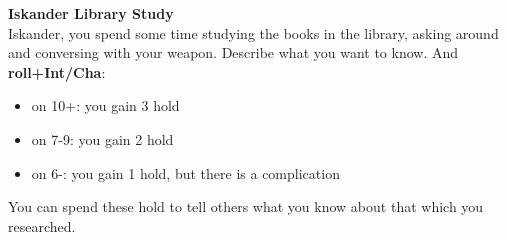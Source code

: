 {\noindent \bfseries Iskander Library Study}
\\

Iskander, you spend some time studying the books in the library, asking around and conversing with your weapon. Describe what you want to know. And \textbf{roll+Int/Cha}:
\begin{itemize}
	\item on 10+: you gain 3 hold
	\item on 7-9: you gain 2 hold
	\item on 6-: you gain 1 hold, but there is a complication
\end{itemize}

You can spend these hold to tell others what you know about that which you researched.